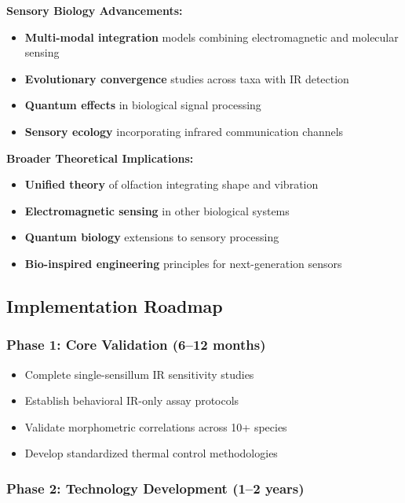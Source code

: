 \documentclass[
  13pt,
  a4paperpaper,
  12pt]{article}
\providecommand{\tightlist}{%
  \setlength{\itemsep}{0pt}\setlength{\parskip}{0pt}}
\begin{document}
\textbf{Sensory Biology Advancements:}

\begin{itemize}
\tightlist
\item
  \textbf{Multi-modal integration} models combining electromagnetic and
  molecular sensing
\item
  \textbf{Evolutionary convergence} studies across taxa with IR
  detection
\item
  \textbf{Quantum effects} in biological signal processing
\item
  \textbf{Sensory ecology} incorporating infrared communication channels
\end{itemize}

\textbf{Broader Theoretical Implications:}

\begin{itemize}
\tightlist
\item
  \textbf{Unified theory} of olfaction integrating shape and vibration
\item
  \textbf{Electromagnetic sensing} in other biological systems
\item
  \textbf{Quantum biology} extensions to sensory processing
\item
  \textbf{Bio-inspired engineering} principles for next-generation
  sensors
\end{itemize}

\subsection{Implementation Roadmap}\label{implementation-roadmap}

\subsubsection{Phase 1: Core Validation (6--12
months)}\label{phase-1-core-validation-612-months}

\begin{itemize}
\tightlist
\item
  Complete single-sensillum IR sensitivity studies
\item
  Establish behavioral IR-only assay protocols
\item
  Validate morphometric correlations across 10+ species
\item
  Develop standardized thermal control methodologies
\end{itemize}

\subsubsection{Phase 2: Technology Development (1--2
years)}\label{phase-2-technology-development-12-years}
\end{document}
